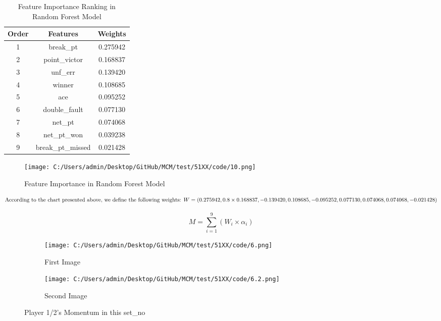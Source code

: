 \documentclass{mcmthesis}
\begin{document}
\begin{table}[h] 
\centering  
\caption{Feature Importance Ranking in Random Forest Model} 
\label{tab2} 
\begin{tabular}{ccc} 
\toprule  
Order      & Features   & Weights  \\
\midrule  
1  & break\_pt & 0.275942 \\ 
2  & point\_victor & 0.168837 \\
3  & unf\_err & 0.139420 \\
4  & winner & 0.108685 \\
5  & ace & 0.095252 \\
6  & double\_fault & 0.077130 \\
7  & net\_pt & 0.074068 \\
8  & net\_pt\_won & 0.039238 \\
9  & break\_pt\_missed & 0.021428 \\

\bottomrule  %
\end{tabular}
\end{table}

\begin{figure}[h]   
\centering          
\texttt{[image: C:/Users/admin/Desktop/GitHub/MCM/test/51XX/code/10.png]}
\caption{Feature Importance in Random Forest Model} \label{fig5}    
\end{figure}

\begin{equation} \label{eq1}
\text{According to the chart presented above, we define the following weights: } \\
W = (0.275942, 0.8 \times 0.168837, -0.139420, 0.108685, -0.095252, 0.077130, 0.074068, 0.074068, -0.021428)
\end{equation}

\begin{equation} \label{eq2}
M = \sum_{i=1}^{9} (W_i \times \alpha_i)
\end{equation}


\begin{figure}[h]
    \centering
    \begin{subfigure}{0.45\textwidth}  
        \texttt{[image: C:/Users/admin/Desktop/GitHub/MCM/test/51XX/code/6.png]}
        \caption{First Image}  
        \label{fig5-6}
    \end{subfigure}
    \hfill
    \begin{subfigure}{0.45\textwidth}
        \texttt{[image: C:/Users/admin/Desktop/GitHub/MCM/test/51XX/code/6.2.png]}
        \caption{Second Image}  %
        \label{fig5-6}
    \end{subfigure}
    
    \caption{Player 1/2’s Momentum in this set\_no} 
    \label{fig:twoimages}
\end{figure}
\end{document}
